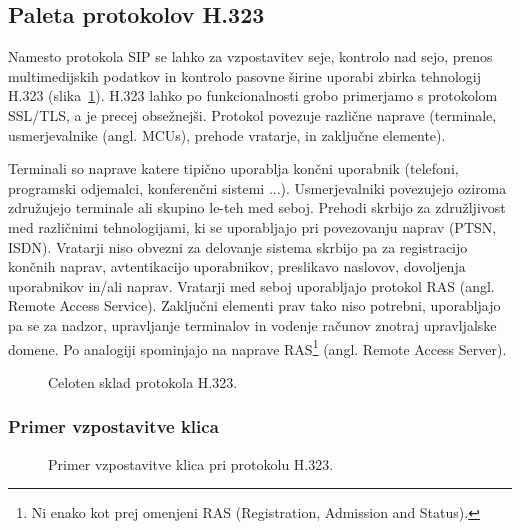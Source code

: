 \documentclass{acm_proc_article-sp}
\begin{document}
\subsection{Paleta protokolov H.323}

Namesto protokola SIP se lahko za vzpostavitev seje, kontrolo nad sejo, prenos multimedijskih podatkov in kontrolo pasovne širine uporabi zbirka tehnologij H.323 (slika~\ref{fig:h323}). H.323 lahko po funkcionalnosti grobo primerjamo s protokolom SSL/TLS, a je precej obsežnejši. Protokol povezuje različne naprave (terminale, usmerjevalnike (angl. MCUs), prehode vratarje, in zaključne elemente).

Terminali so naprave katere tipično uporablja končni uporabnik (telefoni, programski odjemalci, konferenčni sistemi ...). Usmerjevalniki povezujejo oziroma združujejo terminale ali skupino le-teh med seboj. Prehodi skrbijo za združljivost med različnimi tehnologijami, ki se uporabljajo pri povezovanju naprav (PTSN, ISDN). Vratarji niso obvezni za delovanje sistema skrbijo pa za registracijo končnih naprav, avtentikacijo uporabnikov, preslikavo naslovov, dovoljenja uporabnikov in/ali naprav. Vratarji med seboj uporabljajo protokol RAS (angl. Remote Access Service). Zaključni elementi prav tako niso potrebni, uporabljajo pa se za nadzor, upravljanje terminalov in vodenje računov znotraj upravljalske domene. Po analogiji spominjajo na naprave RAS\footnote{Ni enako kot prej omenjeni RAS (Registration, Admission and Status).} (angl. Remote Access Server).

\begin{figure}
\centering
{} %
\caption{Celoten sklad protokola H.323.}
\label{fig:h323}
\end{figure}



\subsubsection{Primer vzpostavitve klica}

\begin{figure}
\centering
{} %
\caption{Primer vzpostavitve klica pri protokolu H.323.}
\label{fig:h323-call}
\end{figure}
\end{document}
